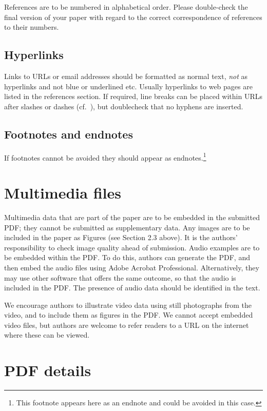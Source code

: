 \documentclass[a4paper,11pt,twocolumn]{article}
\begin{document}
References are to be numbered in alphabetical order. Please
double-check the final version of your paper with regard to the
correct correspondence of references to their numbers.

\subsection{Hyperlinks}

Links to URLs or email addresses should be formatted as normal text,
\textit{not} as hyperlinks and not blue or underlined etc. Usually
hyperlinks to web pages are listed in the references section. If
required, line breaks can be placed within URLs after slashes or
dashes (cf.~\cite{IPA-SIL,IPA-KEYBOARD}), but doublecheck that no hyphens
are inserted.

\subsection{Footnotes and endnotes}

If footnotes cannot be avoided they should appear as
endnotes.\footnote{This footnote appears here as an endnote and could
be avoided in this case.}

\section{Multimedia files}

Multimedia data that are part of the paper are to be embedded in the submitted PDF; they cannot be submitted as supplementary data. Any images are to be included in the paper as Figures (see Section 2.3 above). It is the authors' responsibility to check image quality ahead of submission. Audio examples are to be embedded within the PDF. To do this, authors can generate the PDF, and then embed the audio files using Adobe Acrobat Professional. Alternatively, they may use other software that offers the same outcome, so that the audio is included in the PDF. The presence of audio data should be identified in the text.

We encourage authors to illustrate video data using still photographs from the video, and to include them as figures in the PDF.  We cannot accept embedded video files, but authors are welcome to refer readers to a URL on the internet where these can be viewed.


\section{PDF details}
\end{document}
